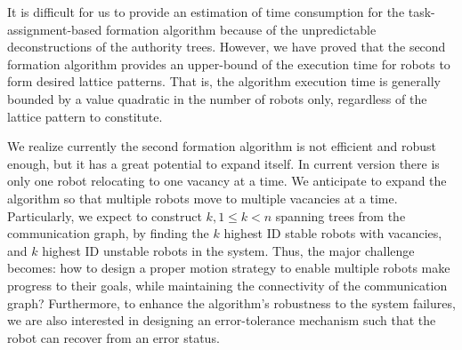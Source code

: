 It is difficult for us to provide an estimation of time consumption for the task-assignment-based formation algorithm because of the unpredictable deconstructions of the authority trees. 
%
However, we have proved that the second formation algorithm provides an upper-bound of the execution time for robots to form desired lattice patterns.  
%
That is, the algorithm execution time is generally bounded by a value quadratic in the number of robots only, regardless of the lattice pattern to constitute.


We realize currently the second formation algorithm is not efficient and robust enough,  but it has a great potential to expand itself. 
%
In current version there is only one robot relocating to one vacancy at a time. 
%
We anticipate to expand the algorithm so that multiple robots move to multiple vacancies at a time. 
%
Particularly, we expect to construct $k, 1\leq k < n$ spanning trees from the communication graph, by finding the $k$ highest ID stable robots with vacancies,
and $k$ highest ID unstable robots in the system.
Thus, the major challenge becomes: how to design a proper motion strategy to enable multiple robots make progress to their goals, while maintaining the connectivity of the communication graph?
%
Furthermore, to enhance the algorithm's robustness to the system failures, we are also interested in designing an error-tolerance mechanism such that the robot can recover from an error status.